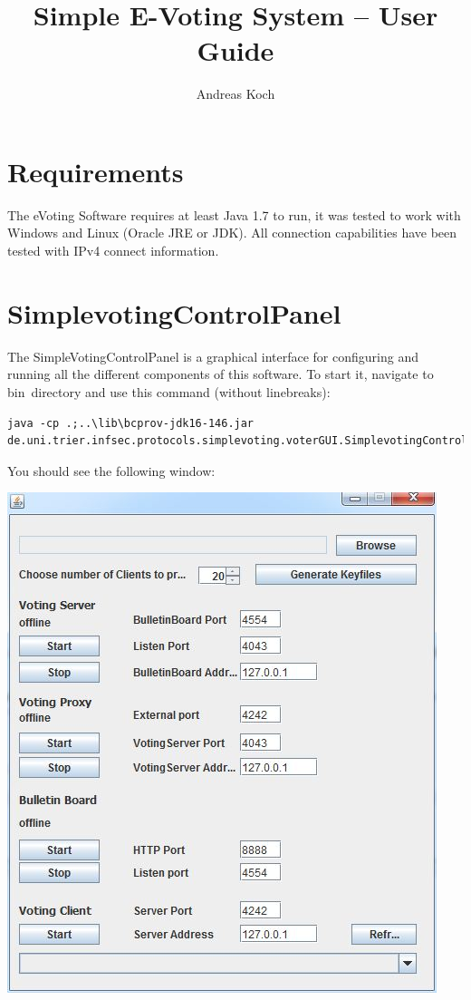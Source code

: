 \documentclass{article}
\title{Simple E-Voting System -- User Guide}
\author{Andreas Koch}
\begin{document}
\maketitle

\tableofcontents
\newpage

\section{Requirements}
The eVoting Software requires at least Java 1.7 to run, it was tested to work with Windows and Linux (Oracle JRE or JDK). All connection capabilities have been tested with IPv4 connect information.

\section{SimplevotingControlPanel}
The SimpleVotingControlPanel is a graphical interface for configuring and running all the different components of this software. To start it, navigate to bin\ directory and use this command (without linebreaks):
\begin{lstlisting}
java -cp .;..\lib\bcprov-jdk16-146.jar 
de.uni.trier.infsec.protocols.simplevoting.voterGUI.SimplevotingControlPanel
\end{lstlisting}
You should see the following window:\\
\begin{center}
\includegraphics{./controlpanel.jpg}
\end{center}
\end{document}
